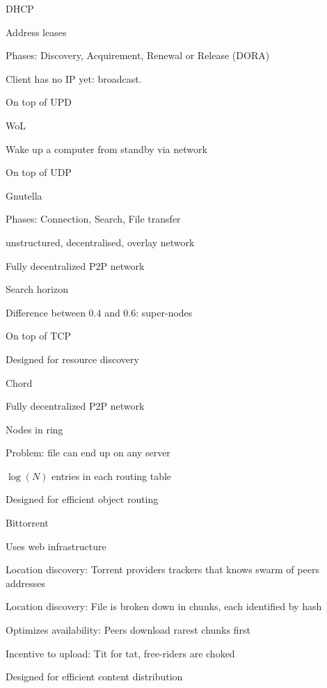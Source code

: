 \documentclass[main.tex]{subfiles}
\begin{document}
\begin{card}{DHCP}
\item Address leases
\item Phases: Discovery, Acquirement, Renewal or Release (DORA)
\item Client has no IP yet: broadcast.
\item On top of UPD
\end{card}


\begin{card}{WoL}
\item Wake up a computer from standby via network
\item On top of UDP
\end{card}




\begin{card}{Gnutella}
\item Phases: Connection, Search, File transfer
\item unstructured, decentralised, overlay network
\item Fully decentralized P2P network
\item Search horizon
\item Difference between 0.4 and 0.6: super-nodes
\item On top of TCP
\item Designed for resource discovery
\end{card}


\begin{card}{Chord}
\item Fully decentralized P2P network
\item Nodes in ring
\item Problem: file can end up on any server
\item $\log(N)$ entries in each routing table
\item Designed for efficient object routing
\end{card}


\begin{card}{Bittorrent}
\item Uses web infrastructure
\item Location discovery: Torrent providers trackers that knows swarm of peers addresses
\item Location discovery: File is broken down in chunks, each identified by hash
\item Optimizes availability: Peers download rarest chunks first
\item Incentive to upload: Tit for tat, free-riders are choked
\item Designed for efficient content distribution
\end{card}
\end{document}
